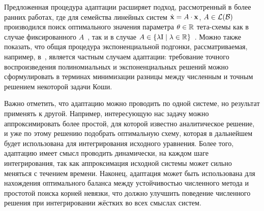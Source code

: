 Предложенная процедура адаптации расширяет подход, рассмотренный в более ранних работах,
где для семейства линейных систем $ \dot{\mathbf{x}} = A \cdot \mathbf{x} $, $ A \in \mathcal{L}(\mathcal{B}) $
производился поиск оптимального значения параметра $ \theta \in \mathbb{R} $ тета-схемы
как в случае фиксированного $ A $~\cite{liniger1970efficient_integration_methods, lambert1991methods, berzins1992adaptive_theta_method},
так и в случае $ A \in \{ \lambda \mathrm{I} \mid \lambda \in \mathbb{R} \} $~\cite{liniger1969global_accuracy, johnson1988tunable_integration_method}.
Можно также показать, что общая процедура экспоненциальной подгонки, рассматриваемая,
например, в~\cite{hollevoet2013exponential_fitting}, является частным случаем адаптации:
требование точного воспроизведения полиномиальных и экспоненциальных решений
можно сформулировать в терминах минимизации разницы между численным и точным решением некоторой задачи Коши.

Важно отметить, что адаптацию можно проводить по одной системе, но результат применять к другой.
Например, интересующую нас задачу можно аппроксимировать более простой,
для которой известно аналитическое решение, и уже по этому решению подобрать оптимальную схему,
которая в дальнейшем будет использована для интегрирования исходного уравнения.
Более того, адаптацию имеет смысл проводить динамически, на каждом шаге интегрирования,
так как аппроксимация исходной системы может сильно меняться с течением времени.
Наконец, адаптация может быть использована для нахождения оптимального баланса
между устойчивостью численного метода и простотой поиска корней невязки,
что должно улучшить поведение численного решения при интегрировании жёстких во всех смыслах систем.

